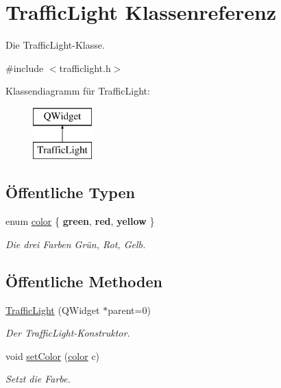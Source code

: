 \hypertarget{class_traffic_light}{}\section{Traffic\+Light Klassenreferenz}
\label{class_traffic_light}


Die Traffic\+Light-\/\+Klasse.  




{\ttfamily \#include $<$trafficlight.\+h$>$}

Klassendiagramm für Traffic\+Light\+:\begin{figure}[H]
\begin{center}
\leavevmode
\includegraphics[height=2.000000cm]{class_traffic_light}
\end{center}
\end{figure}
\subsection*{Öffentliche Typen}
\begin{DoxyCompactItemize}
\item 
\hypertarget{class_traffic_light_a52ce5d9c3d0ec5aad2884db90fc10876}{}\label{class_traffic_light_a52ce5d9c3d0ec5aad2884db90fc10876} 
enum \hyperlink{class_traffic_light_a52ce5d9c3d0ec5aad2884db90fc10876}{color} \{ {\bfseries green}, 
{\bfseries red}, 
{\bfseries yellow}
 \}\begin{DoxyCompactList}\small\item\em Die drei Farben Grün, Rot, Gelb. \end{DoxyCompactList}
\end{DoxyCompactItemize}
\subsection*{Öffentliche Methoden}
\begin{DoxyCompactItemize}
\item 
\hyperlink{class_traffic_light_aa018a0285c92c087e48d3b16be3088ca}{Traffic\+Light} (Q\+Widget $\ast$parent=0)
\begin{DoxyCompactList}\small\item\em Der Traffic\+Light-\/\+Konstruktor. \end{DoxyCompactList}\item 
void \hyperlink{class_traffic_light_ad1e030e87446be2c976f5aedb4f511d5}{set\+Color} (\hyperlink{class_traffic_light_a52ce5d9c3d0ec5aad2884db90fc10876}{color} c)
\begin{DoxyCompactList}\small\item\em Setzt die Farbe. \end{DoxyCompactList}\end{DoxyCompactItemize}


